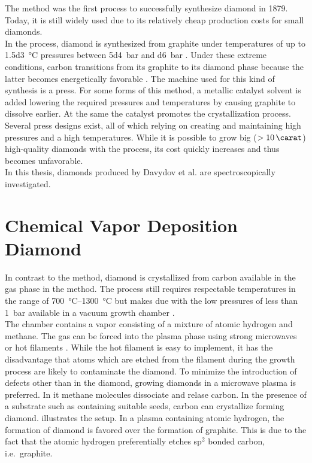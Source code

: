 	The \HPHT method was the first process to successfully synthesize diamond in 1879.
	Today, it is still widely used due to its relatively cheap production costs for small diamonds.
	\\
	In the \HPHT process, diamond is synthesized from graphite under temperatures of up to \SI{1.5d3}{\celsius} pressures between \SI{5d4}{bar} and \SI{d6}{bar} \cite{davis1993diamond}. Under these extreme conditions, carbon transitions from its graphite to its diamond phase because the latter becomes energetically favorable \cite{liander1955artificial, bundy1955man, bovenkerk1993errors, bovenkerk1959preparation}.
	The machine used for this kind of synthesis is a press.
	For some forms of this method, a metallic catalyst solvent is added lowering the required pressures and temperatures by causing graphite to dissolve earlier. At the same the catalyst promotes the crystallization process.
	Several press designs exist, all of which relying on creating and maintaining high pressures and a high temperatures.
	While it is possible to grow big ($> \SI{10}{\carat}$) high-quality diamonds with the \HPHT process, its cost quickly increases and thus becomes unfavorable.
	\\
	In this thesis, \HPHT \nds diamonds produced by Davydov et al. \cite{Davydov2014} are spectroscopically investigated.

\section[CVD]{Chemical Vapor Deposition Diamond}\label{sec::cvd}

	In contrast to the \HPHT method, diamond is crystallized from carbon available in the gas phase in the \CVD method.
	The process still requires respectable temperatures in the range of \SIrange{700}{1300}{\celsius} but makes due with the low pressures of less than \SI{1}{\bar} available in a vacuum growth chamber \cite{schwander2011review}.
	\\
	The chamber contains a vapor consisting of a mixture of atomic hydrogen and methane. The gas can be forced into the plasma phase using strong microwaves or hot filaments \cite{balmer2009chemical, ferro2002synthesis, koizumi2008physics}. While the hot filament is easy to implement, it has the disadvantage that atoms which are etched from the filament during the growth process are likely to contaminate the diamond. To minimize the introduction of defects other than \sivs in the diamond, growing diamonds in a microwave plasma is preferred. In it methane molecules dissociate and relase carbon. In the presence of a substrate such as \ir containing suitable seeds, carbon can crystallize forming diamond.  illustrates the setup. In a plasma containing atomic hydrogen, the formation of diamond is favored over the formation of graphite. This is due to the fact that the atomic hydrogen preferentially etches sp$^2$ bonded carbon, i.e.\ graphite.


